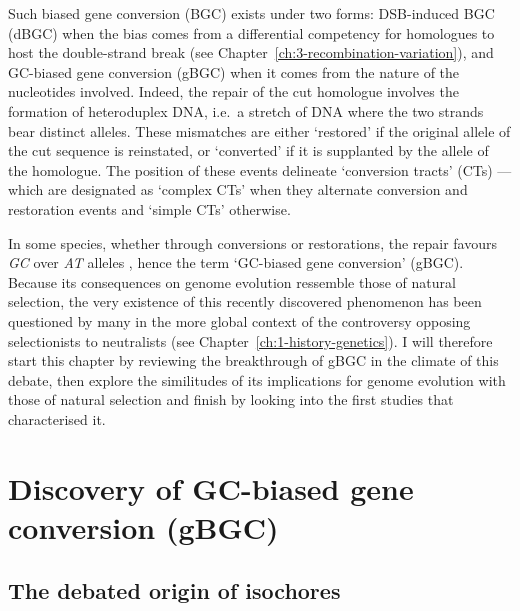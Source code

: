 Such biased gene conversion (BGC) exists under two forms: DSB-induced BGC (dBGC) when the bias comes from a differential competency for homologues to host the double-strand break (see Chapter~\ref{ch:3-recombination-variation}), and GC-biased gene conversion (gBGC) when it comes from the nature of the nucleotides involved.
Indeed, the repair of the cut homologue involves the formation of heteroduplex DNA, i.e.\ a stretch of DNA where the two strands bear distinct alleles.
These mismatches are either ‘restored’ if the original allele of the cut sequence is reinstated, or ‘converted’ if it is supplanted by the allele of the homologue.
The position of these events delineate ‘conversion tracts’ (CTs) — which are designated as ‘complex CTs’ when they alternate conversion and restoration events \citep{borts1989length} and ‘simple CTs’ otherwise.

In some species, whether through conversions or restorations, the repair favours \textit{GC} over \textit{AT} alleles \citep{mancera2008highresolution,si2015widely,williams2015noncrossover,halldorsson2016rate,smeds2016highresolution}, hence the term ‘GC-biased gene conversion’ (gBGC).
Because its consequences on genome evolution ressemble those of natural selection, the very existence of this recently discovered phenomenon has been questioned by many in the more global context of the controversy opposing selectionists to neutralists (see Chapter~\ref{ch:1-history-genetics}).
I will therefore start this chapter by reviewing the breakthrough of gBGC in the climate of this debate, then explore the similitudes of its implications for genome evolution with those of natural selection and finish by looking into the first studies that characterised it.



\section{Discovery of GC-biased gene conversion (gBGC)}
\subsection{The debated origin of isochores}

